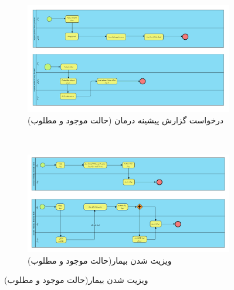 \documentclass[a4paper,12pt]{article}
\begin{document}
	\pagebreak
	\begin{figure}[!h]
		\label{fig2:sec7}
		\begin{center}
			\begin{subfigure}[t]{\textwidth}
				\includegraphics[width=\linewidth]{requestPatientHistory.pdf}
				\caption{درخواست گزارش پیشینه درمان (حالت موجود و مطلوب)}
				\label{subfig3:fig1:sec7}
			\end{subfigure}	\\
			\begin{subfigure}[t]{\textwidth}
				\includegraphics[width=\textwidth]{visiting.pdf}
				\caption{ویزیت شدن بیمار(حالت موجود و مطلوب)}
				\label{subfig4:fig1:sec7}
			\end{subfigure}	
		\end{center}
	\end{figure}

	\pagebreak
\end{document}

